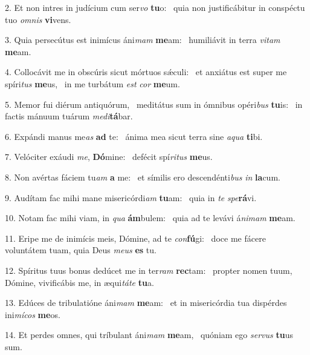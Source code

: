 2. Et non intres in judícium cum ser\textit{vo} \textbf{tu}o: \ast\  quia non justificábitur in conspéctu tuo \textit{om}\textit{nis} \textbf{vi}vens.\

3. Quia persecútus est inimícus áni\textit{mam} \textbf{me}am: \ast\  humiliávit in terra \textit{vi}\textit{tam} \textbf{me}am.\

4. Collocávit me in obscúris sicut mórtuos sǽculi: \dag\  et anxiátus est super me spíri\textit{tus} \textbf{me}us, \ast\  in me turbátum \textit{est} \textit{cor} \textbf{me}um.\

5. Memor fui diérum antiquórum, \dag\  meditátus sum in ómnibus opéri\textit{bus} \textbf{tu}is: \ast\  in factis mánuum tuárum \textit{me}\textit{di}\textbf{tá}bar.\

6. Expándi manus me\textit{as} \textbf{ad} te: \ast\  ánima mea sicut terra sine \textit{a}\textit{qua} \textbf{ti}bi.\

7. Velóciter exáudi \textit{me}, \textbf{Dó}mine: \ast\  defécit spí\textit{ri}\textit{tus} \textbf{me}us.\

8. Non avértas fáciem tu\textit{am} \textbf{a} me: \ast\  et símilis ero descendénti\textit{bus} \textit{in} \textbf{la}cum.\

9. Audítam fac mihi mane misericórdi\textit{am} \textbf{tu}am: \ast\  quia in \textit{te} \textit{spe}\textbf{rá}vi.\

10. Notam fac mihi viam, in \textit{qua} \textbf{ám}bulem: \ast\  quia ad te levávi á\textit{ni}\textit{mam} \textbf{me}am.\

11. Eripe me de inimícis meis, Dómine, ad te \textit{con}\textbf{fú}gi: \ast\  doce me fácere voluntátem tuam, quia Deus \textit{me}\textit{us} \textbf{es} tu.\

12. Spíritus tuus bonus dedúcet me in ter\textit{ram} \textbf{rec}tam: \ast\  propter nomen tuum, Dómine, vivificábis me, in æqui\textit{tá}\textit{te} \textbf{tu}a.\

13. Edúces de tribulatióne áni\textit{mam} \textbf{me}am: \ast\  et in misericórdia tua dispérdes ini\textit{mí}\textit{cos} \textbf{me}os.\

14. Et perdes omnes, qui tríbulant áni\textit{mam} \textbf{me}am, \ast\  quóniam ego \textit{ser}\textit{vus} \textbf{tu}us sum.\


